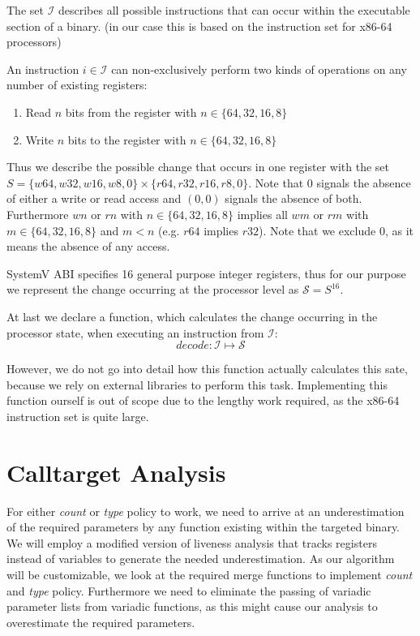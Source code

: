 The set $\mathcal{I}$ describes all possible instructions that can occur within the executable section of a binary. (in our case this is based on the instruction set for x86-64 processors)

An instruction $i \in \mathcal{I}$ can non-exclusively perform two kinds of operations on any number of existing registers:

\begin{enumerate}
\item Read $n$ bits from the register with $n \in \{ 64, 32, 16, 8 \}$
\item Write $n$ bits to the register with $n \in \{ 64, 32, 16, 8 \}$
\end{enumerate}

Thus we describe the possible change that occurs in one register with the set $S = \{ w64, w32, w16, w8, 0 \} \times \{r64, r32, r16, r8, 0 \}$. Note that 0 signals the absence of either a write or read access and $(0, 0)$ signals the absence of both. Furthermore $wn$ or $rn$ with $n \in \{64,32,16,8\}$ implies all $wm$ or $rm$ with $m \in \{64,32,16,8\}$ and $m < n$ (e.g. $r64$ implies $r32$). Note that we exclude 0, as it means the absence of any access.

SystemV ABI specifies 16 general purpose integer registers, thus for our purpose we represent the change occurring at the processor level as $\mathcal{S} = S^{16}$.

At last we declare a function, which calculates the change occurring in the processor state, when executing an instruction from $\mathcal{I}$:
\[
decode : \mathcal{I} \mapsto \mathcal{S}
\]

However, we do not go into detail how this function actually calculates this sate, because we rely on external libraries to perform this task. Implementing this function ourself is out of scope due to the lengthy work required, as the x86-64 instruction set is quite large.

\section{Calltarget Analysis}
\label{section:calltargetanalysis}
For either \emph{count} or \emph{type} policy to work, we need to arrive at an underestimation of the required parameters by any function existing within the targeted binary. We will employ a modified version of liveness analysis that tracks registers instead of variables to generate the needed underestimation. As our algorithm will be customizable, we look at the required merge functions to implement \emph{count} and \emph{type} policy. Furthermore we need to eliminate the passing of variadic parameter lists from variadic functions, as this might cause our analysis to overestimate the required parameters.

